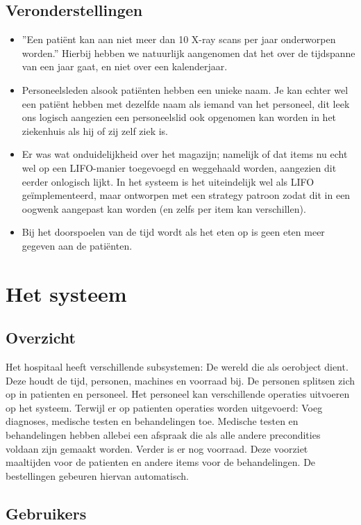 \documentclass[a4paper]{article}
\begin{document}
\subsection{Veronderstellingen \label{sec:assumptions}}
\begin{itemize}
\item ''Een pati\"ent kan aan niet meer dan 10 X-ray scans per jaar onderworpen worden.'' Hierbij hebben we natuurlijk aangenomen dat het over de tijdspanne van een jaar gaat, en niet over een kalenderjaar.
\item Personeelsleden alsook pati\"enten hebben een unieke naam. Je kan echter wel een pati\"ent hebben met dezelfde naam als iemand van het personeel, dit leek ons logisch aangezien een personeelslid ook opgenomen kan worden in het ziekenhuis als hij of zij zelf ziek is.
\item Er was wat onduidelijkheid over het magazijn; namelijk of dat items nu echt wel op een LIFO-manier toegevoegd en weggehaald worden, aangezien dit eerder onlogisch lijkt. In het systeem is het uiteindelijk wel als LIFO geïmplementeerd, maar ontworpen met een strategy patroon zodat dit in een oogwenk aangepast kan worden (en zelfs per item kan verschillen).
\item Bij het doorspoelen van de tijd wordt als het eten op is geen eten meer gegeven aan de pati\"enten.
\end{itemize}
\section{Het systeem}
\subsection{Overzicht} %
Het hospitaal heeft verschillende subsystemen: De wereld die als oerobject dient. Deze houdt de tijd, personen, machines en voorraad bij. De personen splitsen zich op in patienten en personeel. Het personeel kan verschillende operaties uitvoeren op het systeem. Terwijl er op patienten operaties worden uitgevoerd: Voeg diagnoses, medische testen en behandelingen toe. Medische testen en behandelingen hebben allebei een afspraak die als alle andere precondities voldaan zijn gemaakt worden. Verder is er nog voorraad. Deze voorziet maaltijden voor de patienten en andere items voor de behandelingen. De bestellingen gebeuren hiervan automatisch. 


\subsection{Gebruikers \label{sec:users}}	
\end{document}
